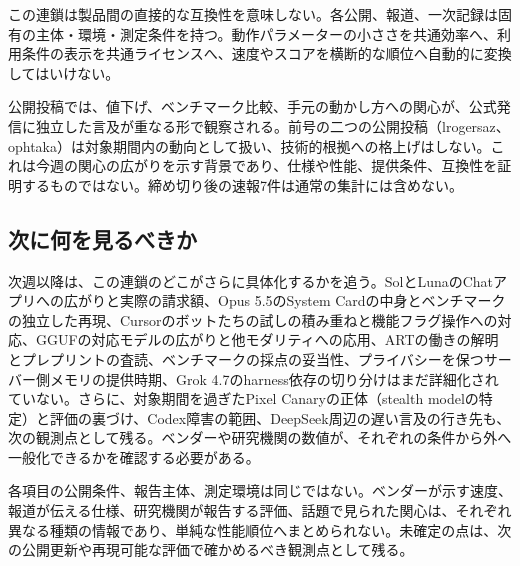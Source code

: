 この連鎖は製品間の直接的な互換性を意味しない。各公開、報道、一次記録は固有の主体・環境・測定条件を持つ。動作パラメーターの小ささを共通効率へ、利用条件の表示を共通ライセンスへ、速度やスコアを横断的な順位へ自動的に変換してはいけない。

\begin{communitynote}
公開投稿では、値下げ、ベンチマーク比較、手元の動かし方への関心が、公式発信に独立した言及が重なる形で観察される。前号の二つの公開投稿（lrogersaz、ophtaka）は対象期間内の動向として扱い、技術的根拠への格上げはしない\cite{w39x-c10-carry1,w39x-c10-carry2}。これは今週の関心の広がりを示す背景であり、仕様や性能、提供条件、互換性を証明するものではない。締め切り後の速報7件は通常の集計には含めない。
\end{communitynote}

\clearpage
\subsection*{次に何を見るべきか}
次週以降は、この連鎖のどこがさらに具体化するかを追う。SolとLunaのChatアプリへの広がりと実際の請求額、Opus 5.5のSystem Cardの中身とベンチマークの独立した再現、Cursorのボットたちの試しの積み重ねと機能フラグ操作への対応、GGUFの対応モデルの広がりと他モダリティへの応用、ARTの働きの解明とプレプリントの査読、ベンチマークの採点の妥当性、プライバシーを保つサーバー側メモリの提供時期、Grok 4.7のharness依存の切り分けはまだ詳細化されていない。さらに、対象期間を過ぎたPixel Canaryの正体（stealth modelの特定）と評価の裏づけ、Codex障害の範囲、DeepSeek周辺の遅い言及の行き先も、次の観測点として残る。ベンダーや研究機関の数値が、それぞれの条件から外へ一般化できるかを確認する必要がある。

\begin{claimboundary}[この総括の読み方]
各項目の公開条件、報告主体、測定環境は同じではない。ベンダーが示す速度、報道が伝える仕様、研究機関が報告する評価、話題で見られた関心は、それぞれ異なる種類の情報であり、単純な性能順位へまとめられない。未確定の点は、次の公開更新や再現可能な評価で確かめるべき観測点として残る。
\end{claimboundary}
